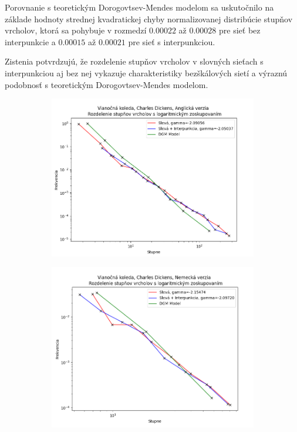 Porovnanie s teoretickým Dorogovtsev-Mendes modelom sa uskutočnilo na základe hodnoty strednej kvadratickej chyby normalizovanej distribúcie stupňov vrcholov,
ktorá sa pohybuje v rozmedzí $0.00022$ až $0.00028$ pre sieť bez interpunkcie a $0.00015$ až $0.00021$ pre sieť s interpunkciou.

Zistenia potvrdzujú, že rozdelenie stupňov vrcholov v slovných sieťach s interpunkciou aj bez nej vykazuje charakteristiky bezškálových sietí a výraznú
podobnosť s teoretickým Dorogovtsev-Mendes modelom.



\begin{figure}[htbp]
    \centering
    \begin{subfigure}[b]{0.9\textwidth}
        \includegraphics[width=\textwidth]{images/lbdegdist/Screenshot_1.png}
    \end{subfigure}

    \vspace{0.3cm}

    \begin{subfigure}[b]{0.9\textwidth}
        \includegraphics[width=\textwidth]{images/lbdegdist/Screenshot_2.png}
    \end{subfigure}
    

\end{figure}

